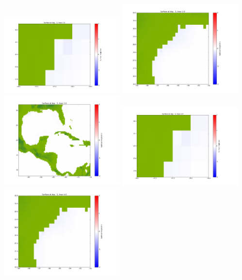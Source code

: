 \documentclass[11pt]{article}
\begin{document}
\vskip 10pt 
\includegraphics[width=0.475\textwidth]{frame0085fig1001.png}
\includegraphics[width=0.475\textwidth]{frame0085fig1002.png}
\vskip 10pt 
\includegraphics[width=0.475\textwidth]{frame0085fig1003.png}
\vskip 10pt 
\includegraphics[width=0.475\textwidth]{frame0086fig1001.png}
\includegraphics[width=0.475\textwidth]{frame0086fig1002.png}
\end{document}
